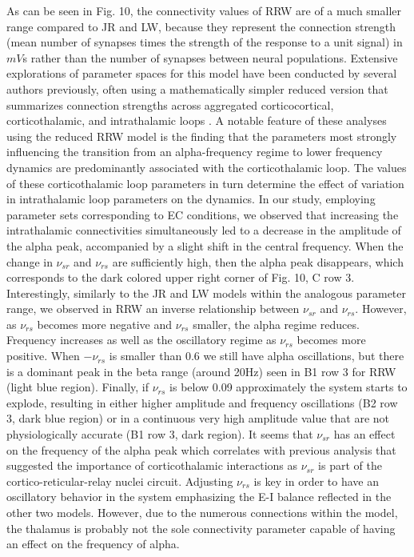 \documentclass[12pt,twoside]{article}
\begin{document}
As can be seen in Fig. 10, the connectivity values of RRW are of a much smaller range compared to JR and LW, because they represent the connection strength (mean number of synapses times the strength of the response to a unit signal) in $mV$s rather than the number of synapses between neural populations. Extensive explorations of parameter spaces for this model have been conducted by several authors previously, often using a mathematically simpler reduced version that summarizes connection strengths across aggregated corticocortical, corticothalamic, and intrathalamic loops \citep{roberts2012corticothalamic, abeysuriya2015physiologically}. A notable feature of these analyses using the reduced RRW model is the finding that the parameters most strongly influencing the transition from an alpha-frequency regime to lower frequency dynamics are predominantly associated with the corticothalamic loop. The values of these corticothalamic loop parameters in turn determine the effect of variation in intrathalamic loop parameters on the dynamics. In our study, employing parameter sets corresponding to EC conditions, we observed that increasing the intrathalamic connectivities simultaneously led to a decrease in the amplitude of the alpha peak, accompanied by a slight shift in the central frequency. When the change in $\nu_{sr}$ and $\nu_{rs}$ are sufficiently high, then the alpha peak disappears, which corresponds to the dark colored upper right corner of Fig. 10, C row 3. Interestingly, similarly to the JR and LW models within the analogous parameter range, we observed in RRW an inverse relationship between $\nu_{sr}$ and $\nu_{rs}$. However, as $\nu_{rs}$ becomes more negative and $\nu_{rs}$ smaller, the alpha regime reduces. Frequency increases as well as the oscillatory regime as $\nu_{rs}$ becomes more positive. When $-\nu_{rs}$ is smaller than 0.6 we still have alpha oscillations, but there is a dominant peak in the beta range (around 20Hz) seen in B1 row 3 for RRW (light blue region). Finally, if $\nu_{rs}$ is below 0.09 approximately the system starts to explode, resulting in either higher amplitude and frequency oscillations (B2 row 3, dark blue region) or in a continuous very high amplitude value that are not physiologically accurate (B1 row 3, dark region). It seems that $\nu_{sr}$ has an effect on the frequency of the alpha peak which correlates with previous analysis that suggested the importance of corticothalamic interactions as $\nu_{sr}$ is part of the cortico-reticular-relay nuclei circuit. Adjusting $\nu_{rs}$ is key in order to have an oscillatory behavior in the system emphasizing the E-I balance reflected in the other two models. However, due to the numerous connections within the model, the thalamus is probably not the sole connectivity parameter capable of having an effect on the frequency of alpha. 
\end{document}
